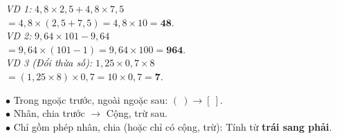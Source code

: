 \documentclass[14pt,a4paper,oneside]{extbook}
\begin{document}
\noindent
\begin{minipage}[t]{0.52\textwidth}
  \begin{tcolorbox}[
    enhanced,
    title={\footnotesize\bfseries\color{white}\faBolt\ 2. Kỹ thuật đưa về cùng thừa số chung},
    colback=teal!2!white,
    colframe=teal!75!black,
    arc=2.5mm, boxrule=0.8pt, top=1.8mm, bottom=1.8mm, left=2.2mm, right=2.2mm
  ]
    \footnotesize
    \textit{VD 1:} $4,8 \times 2,5 + 4,8 \times 7,5$\\
    $= 4,8 \times (2,5 + 7,5) = 4,8 \times 10 = \mathbf{48}$.\\[2pt]
    \textit{VD 2:} $9,64 \times 101 - 9,64$\\
    $= 9,64 \times (101 - 1) = 9,64 \times 100 = \mathbf{964}$.\\[2pt]
    \textit{VD 3 (Đổi thừa số):} $1,25 \times 0,7 \times 8$\\
    $= (1,25 \times 8) \times 0,7 = 10 \times 0,7 = \mathbf{7}$.
  \end{tcolorbox}
\end{minipage}%
\hfill
\begin{minipage}[t]{0.46\textwidth}
  \begin{tcolorbox}[
    enhanced,
    title={\footnotesize\bfseries\color{white}\faBalanceScale\ 3. Thứ tự tính biểu thức},
    colback=purple!2!white,
    colframe=purple!70!black,
    arc=2.5mm, boxrule=0.8pt, top=1.8mm, bottom=1.8mm, left=2mm, right=2mm
  ]
    \footnotesize
    $\bullet$ Trong ngoặc trước, ngoài ngoặc sau: $( \ ) \rightarrow [ \ ]$.\\
    $\bullet$ Nhân, chia trước $\rightarrow$ Cộng, trừ sau.\\
    $\bullet$ Chỉ gồm phép nhân, chia (hoặc chỉ có cộng, trừ): Tính từ \textbf{trái sang phải}.
  \end{tcolorbox}
\end{minipage}

\vspace{3mm}
\end{document}
